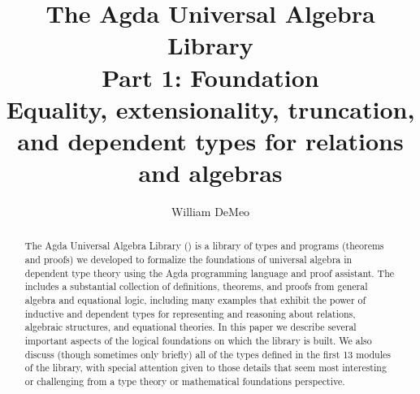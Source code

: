 \documentclass[a4paper,UKenglish,cleveref,autoref,thm-restate,12pt]{../lipics-v2021-wjd}
\title{The Agda Universal Algebra Library\\%
Part 1: Foundation\\[-5pt]
{\large Equality, extensionality, truncation, and dependent types for relations and algebras} }%
\author{William DeMeo}
       {Department of Algebra, Charles University in Prague \and \url{https://williamdemeo.gitlab.io}}
       {williamdemeo@gmail.com}{https://orcid.org/0000-0003-1832-5690}{}
\begin{document}
\maketitle


\begin{abstract}
The Agda Universal Algebra Library (\ualib) is a library of types and programs (theorems and proofs) we developed to formalize the foundations of universal algebra in dependent type theory using the Agda programming language and proof assistant. The \ualib includes a substantial collection of definitions, theorems, and proofs from general algebra and equational logic, including many examples that exhibit the power of inductive and dependent types for representing and reasoning about relations, algebraic structures, and equational theories. In this paper we describe several important aspects of the logical foundations on which the library is built. We also discuss (though sometimes only briefly) all of the types defined in the first 13 modules of the library, with special attention given to those details that seem most interesting or challenging from a type theory or mathematical foundations perspective.
\end{abstract}



\newpage %

\setcounter{tocdepth}{2}
\tableofcontents








% 
% 
% 
% 
% 












% 








\end{document}
